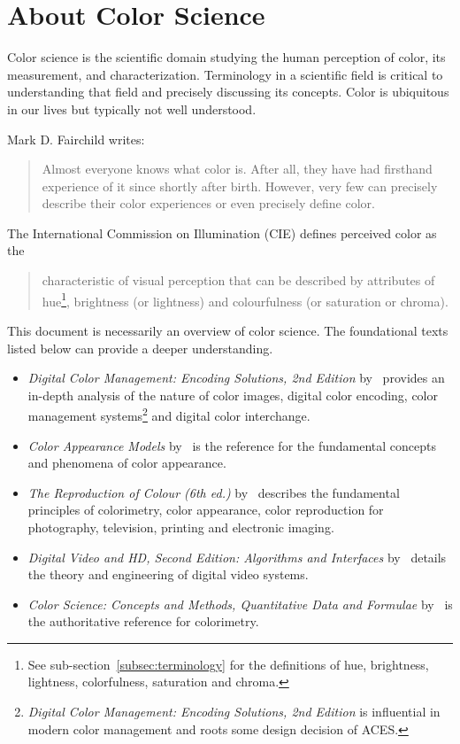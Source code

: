 \section{About Color Science}%
\label{sec:about-color-science}

Color science is the scientific domain studying the human perception of color, its measurement, and characterization. Terminology in a scientific field is critical to understanding that field and precisely discussing its concepts.
Color is ubiquitous in our lives but typically not well understood.

Mark D. Fairchild writes:~\blockcquote[85]{Fairchild2013u}{Almost everyone knows what color is. After all, they have had firsthand experience of it since shortly after birth. However, very few can precisely describe their color experiences or even precisely define color.}

The International Commission on Illumination (CIE) defines perceived color as the~\blockcquote{CIEbk}{characteristic of visual perception that can be described by attributes of hue\footnote{See sub-section~\ref{subsec:terminology} for the definitions of hue, brightness, lightness, colorfulness, saturation and chroma.}, brightness (or lightness) and colourfulness (or saturation or chroma).}

This document is necessarily an overview of color science. The foundational texts listed below can provide a deeper understanding.

\begin{itemize}
    \item \textit{Digital Color Management: Encoding Solutions, 2nd Edition} by~\textcite{Madden2007} provides an in-depth analysis of the nature of color images, digital color encoding, color management systems\footnote{\textit{Digital Color Management: Encoding Solutions, 2nd Edition} is influential in modern color management and roots some design decision of ACES.} and digital color interchange.
    \item \textit{Color Appearance Models} by~\textcite{Fairchild2013u} is the reference for the fundamental concepts and phenomena of color appearance.
    \item \textit{The Reproduction of Colour (6th ed.)} by~\textcite{Hunt2004b} describes the fundamental principles of colorimetry, color appearance, color reproduction for photography, television, printing and electronic imaging.
    \item \textit{Digital Video and HD, Second Edition: Algorithms and Interfaces} by~\textcite{Poynton2012} details the theory and engineering of digital video systems.
    \item \textit{Color Science: Concepts and Methods, Quantitative Data and Formulae} by~\textcite{Wyszecki2000bi} is the authoritative reference for colorimetry.
\end{itemize}

